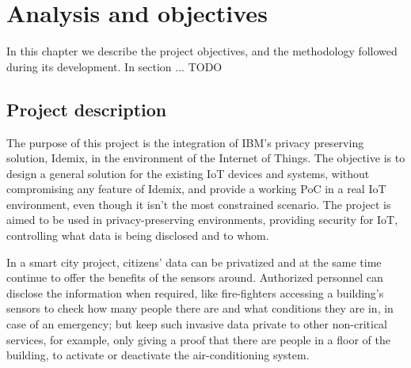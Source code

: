 \chapter{Analysis and objectives}\label{ch:objectives}





In this chapter we describe the project objectives, and the methodology followed during its development. In section ... TODO

\section{Project description}

The purpose of this project is the integration of IBM's privacy preserving solution, Idemix, in the environment of the Internet of Things. The objective is to design a general solution for the existing IoT devices and systems, without compromising any feature of Idemix, and provide a working PoC in a real IoT environment, even though it isn't the most constrained scenario. The project is aimed to be used in privacy-preserving environments, providing security for IoT, controlling what data is being disclosed and to whom.

In a smart city project, citizens' data can be privatized and at the same time continue to offer the benefits of the sensors around. Authorized personnel can disclose the information when required, like fire-fighters accessing a building's sensors to check how many people there are and what conditions they are in, in case of an emergency; but keep such invasive data private to other non-critical services, for example, only giving a proof that there are people in a floor of the building, to activate or deactivate the air-conditioning system.

\hfil



